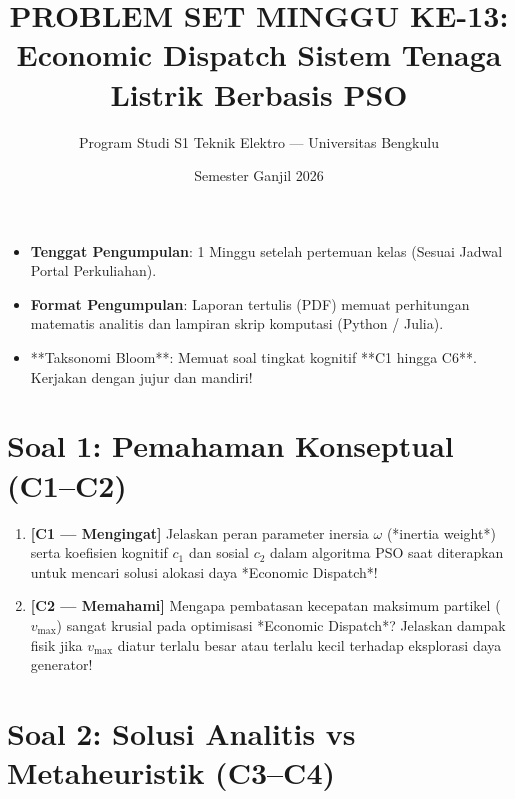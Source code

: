 \documentclass[11pt,a4paper]{article}
\title{\vspace{-1cm}\textbf{PROBLEM SET MINGGU KE-13:}\\Economic Dispatch Sistem Tenaga Listrik Berbasis PSO}
\author{Program Studi S1 Teknik Elektro --- Universitas Bengkulu}
\date{Semester Ganjil 2026}
\begin{document}
\maketitle

\begin{tcolorbox}[colback=unibgold!10,colframe=unibgold!80!black,title=\textbf{Petunjuk Pengerjaan dan Tenggat Waktu}]
\begin{itemize}[leftmargin=*]
    \item \textbf{Tenggat Pengumpulan}: 1 Minggu setelah pertemuan kelas (Sesuai Jadwal Portal Perkuliahan).
    \item \textbf{Format Pengumpulan}: Laporan tertulis (PDF) memuat perhitungan matematis analitis dan lampiran skrip komputasi (Python / Julia).
    \item **Taksonomi Bloom**: Memuat soal tingkat kognitif **C1 hingga C6**. Kerjakan dengan jujur dan mandiri!
\end{itemize}
\end{tcolorbox}

\vspace{0.3cm}

\section*{Soal 1: Pemahaman Konseptual (C1--C2)}

\begin{enumerate}[label=\textbf{1.\arabic*}, leftmargin=*]
    \item \textbf{[C1 --- Mengingat]} Jelaskan peran parameter inersia $\omega$ (*inertia weight*) serta koefisien kognitif $c_1$ dan sosial $c_2$ dalam algoritma PSO saat diterapkan untuk mencari solusi alokasi daya *Economic Dispatch*!
    
    \item \textbf{[C2 --- Memahami]} Mengapa pembatasan kecepatan maksimum partikel ($v_{\max}$) sangat krusial pada optimisasi *Economic Dispatch*? Jelaskan dampak fisik jika $v_{\max}$ diatur terlalu besar atau terlalu kecil terhadap eksplorasi daya generator!
\end{enumerate}

\section*{Soal 2: Solusi Analitis vs Metaheuristik (C3--C4)}
\end{document}

